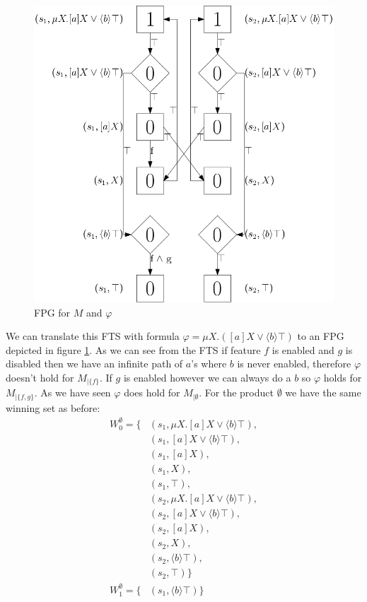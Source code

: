 \begin{figure}[h]
	\centering
	\includegraphics[scale=0.3]{Examples/ExamleVerification/FPG}
	\caption[FPG for $M$ and $\varphi$]{FPG for $M$ and $\varphi$}
	\label{fig:exverfpg}
\end{figure}
We can translate this FTS with formula $\varphi = \mu X. ([a] X \vee \langle b \rangle \top)$ to an FPG depicted in figure \ref{fig:exverfpg}. As we can see from the FTS if feature $f$ is enabled and $g$ is disabled then we have an infinite path of $a$'s where $b$ is never enabled, therefore $\varphi$ doesn't hold for $M_{|\{f\}}$. If $g$ is enabled however we can always do a $b$ so $\varphi$ holds for $M_{|\{f,g\}}$. As we have seen $\varphi$ does hold for $M_{|\emptyset}$. For the product $\emptyset$ we have the same winning set as before:
\begin{align*}
W_0^\emptyset = \{& (s_1, \mu X.[a]X \vee \langle b \rangle \top),\\
& (s_1, [a]X \vee \langle b \rangle \top),\\
& (s_1, [a]X),\\
& (s_1, X),\\
& (s_1, \top),\\
& (s_2, \mu X.[a]X \vee \langle b \rangle \top),\\
& (s_2, [a]X \vee \langle b \rangle \top),\\
& (s_2, [a]X),\\
& (s_2, X),\\
& (s_2, \langle b \rangle \top),\\
& (s_2, \top)
\}\\
W_1^\emptyset = \{& (s_1, \langle b \rangle \top )\}
\end{align*}
